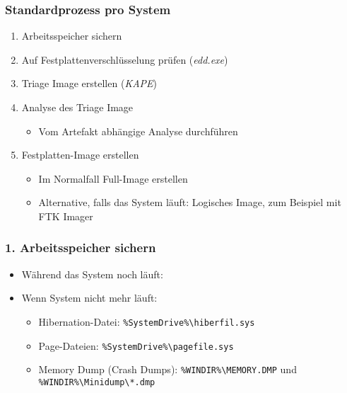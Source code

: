 \subsubsection{Standardprozess pro System}
\begin{enumerate}
    \item Arbeitsspeicher sichern
    \item Auf Festplattenverschlüsselung prüfen (\textit{edd.exe})
    \item Triage Image erstellen (\textit{KAPE})
    \item Analyse des Triage Image
    \begin{itemize}
        \item Vom Artefakt abhängige Analyse durchführen
    \end{itemize}
    \item Festplatten-Image erstellen
    \begin{itemize}
        \item Im Normalfall Full-Image erstellen
        \item Alternative, falls das System läuft: Logisches Image, zum Beispiel mit FTK Imager
    \end{itemize}
\end{enumerate}

\subsubsection{1. Arbeitsspeicher sichern}
\begin{itemize}
    \item Während das System noch läuft:
    \item Wenn System nicht mehr läuft:
    \begin{itemize}
        \item Hibernation-Datei: \lstinline|%SystemDrive%\hiberfil.sys|
        \item Page-Dateien: \lstinline|%SystemDrive%\pagefile.sys|
        \item Memory Dump (Crash Dumps): \lstinline|%WINDIR%\MEMORY.DMP| und \lstinline|%WINDIR%\Minidump\*.dmp|
    \end{itemize}
\end{itemize}

